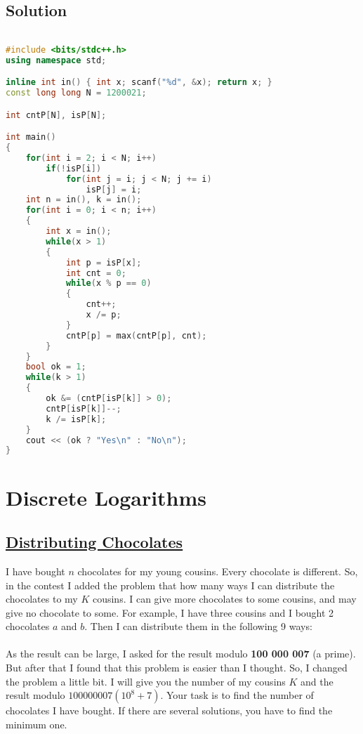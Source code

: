 \documentclass[10pt,a4paper]{article}
\begin{document}
\subsection*{Solution}
\begin{lstlisting}[language=C++, caption={Remainders Game}, label={1st:code}, mathescape=true, breaklines=true]

#include <bits/stdc++.h>
using namespace std;

inline int in() { int x; scanf("%d", &x); return x; }
const long long N = 1200021;

int cntP[N], isP[N];

int main()
{
	for(int i = 2; i < N; i++)
		if(!isP[i])
			for(int j = i; j < N; j += i)
				isP[j] = i;
	int n = in(), k = in();
	for(int i = 0; i < n; i++)
	{
		int x = in();
		while(x > 1)
		{
			int p = isP[x];
			int cnt = 0;
			while(x % p == 0)
			{
				cnt++;
				x /= p;
			}
			cntP[p] = max(cntP[p], cnt);
		}
	}
	bool ok = 1;
	while(k > 1)
	{
		ok &= (cntP[isP[k]] > 0);
		cntP[isP[k]]--;
		k /= isP[k];
	}
	cout << (ok ? "Yes\n" : "No\n");
}
\end{lstlisting}

\section{Discrete Logarithms}
\subsection*{\hyperlink{https://lightoj.com/problem/distributing-chocolates}{\underline{Distributing Chocolates}}}

I have bought $n$ chocolates for my young cousins. Every chocolate is different. So, in the contest I added the problem that how many ways I can distribute the chocolates to my $K$ cousins. I can give more chocolates to some cousins, and may give no chocolate to some. For example, I have three cousins and I bought 2 chocolates $a$ and $b$. Then I can distribute them in the following 9 ways:
\\ \\
As the result can be large, I asked for the result modulo \textbf{100 000 007} (a prime). But after that I found that this problem is easier than I thought. So, I changed the problem a little bit. I will give you the number of my cousins $K$ and the result modulo $100000007 (10^8 + 7)$. Your task is to find the number of chocolates I have bought. If there are several solutions, you have to find the minimum one.
\end{document}
